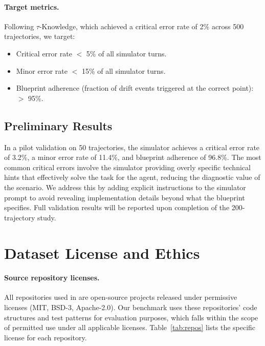 \paragraph{Target metrics.}
Following $\tau$-Knowledge, which achieved a critical error rate of 2\% across 500 trajectories, we target:

\begin{itemize}[leftmargin=*, itemsep=2pt]
    \item Critical error rate $<$ 5\% of all simulator turns.
    \item Minor error rate $<$ 15\% of all simulator turns.
    \item Blueprint adherence (fraction of drift events triggered at the correct point): $>$ 95\%.
\end{itemize}

\subsection{Preliminary Results}

In a pilot validation on 50 trajectories, the simulator achieves a critical error rate of 3.2\%, a minor error rate of 11.4\%, and blueprint adherence of 96.8\%. The most common critical errors involve the simulator providing overly specific technical hints that effectively solve the task for the agent, reducing the diagnostic value of the scenario. We address this by adding explicit instructions to the simulator prompt to avoid revealing implementation details beyond what the blueprint specifies. Full validation results will be reported upon completion of the 200-trajectory study.


\section{Dataset License and Ethics}
\label{app:ethics}

\paragraph{Source repository licenses.}
All repositories used in \bench{} are open-source projects released under permissive licenses (MIT, BSD-3, Apache-2.0). Our benchmark uses these repositories' code structures and test patterns for evaluation purposes, which falls within the scope of permitted use under all applicable licenses. Table~\ref{tab:repos} lists the specific license for each repository.

